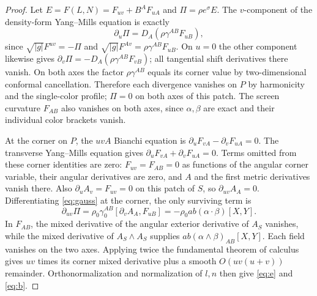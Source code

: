 \documentclass[11pt]{article}
\begin{document}
\begin{proof}
Let \(E=F(L,N)=F_{uv}+B^A F_{uA}\) and \(\Pi=\rho e^\sigma E\). The \(v\)-component of the density-form Yang--Mills equation is exactly
\begin{equation}
 \partial_u\Pi=D_A(\rho\gamma^{AB}F_{uB}),
 \label{eq:gauss}
\end{equation}
since \(\sqrt{|g|}F^{uv}=-\Pi\) and \(\sqrt{|g|}F^{Av}=\rho\gamma^{AB}F_{uB}\). On \(u=0\) the other component likewise gives
\(\partial_v\Pi=-D_A(\rho\gamma^{AB}F_{vB})\); all tangential shift derivatives there vanish. On both axes the factor \(\rho\gamma^{AB}\) equals its corner value by two-dimensional conformal cancellation. Therefore each divergence vanishes on \(P\) by harmonicity and the single-color profile; \(\Pi=0\) on both axes of this patch. The screen curvature \(F_{AB}\) also vanishes on both axes, since \(\alpha,\beta\) are exact and their individual color brackets vanish.

At the corner on \(P\), the \(uvA\) Bianchi equation is
\(\partial_uF_{vA}-\partial_vF_{uA}=0\). The transverse Yang--Mills equation gives \(\partial_uF_{vA}+\partial_vF_{uA}=0\). Terms omitted from these corner identities are zero: \(F_{uv}=F_{AB}=0\) as functions of the angular corner variable, their angular derivatives are zero, and \(A\) and the first metric derivatives vanish there. Also \(\partial_u A_v=F_{uv}=0\) on this patch of \(S\), so
\(\partial_{uv}A_A=0\). Differentiating \eqref{eq:gauss} at the corner, the only surviving term is
\[
 \partial_{uv}\Pi
   =\rho_0\gamma_0^{AB}[\partial_v A_A,F_{uB}]
   =-\rho_0 ab(\alpha\cdot\beta)[X,Y].
\]
In \(F_{AB}\), the mixed derivative of the angular exterior derivative of \(A_S\) vanishes, while the mixed derivative of \(A_S\wedge A_S\) supplies \(ab(\alpha\wedge\beta)_{AB}[X,Y]\). Each field vanishes on the two axes. Applying twice the fundamental theorem of calculus gives \(uv\) times its corner mixed derivative plus a smooth \(O(uv(u+v))\) remainder. Orthonormalization and normalization of \(l,n\) then give \eqref{eq:e} and \eqref{eq:b}.


\end{proof}
\end{document}
